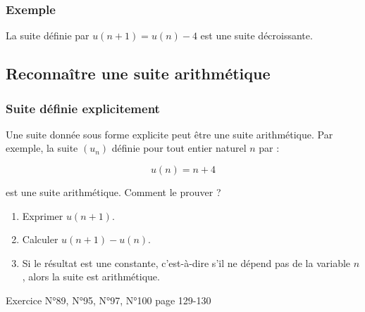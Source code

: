 \documentclass[a4paper,12pt]{article}
\begin{document}
\subsubsection*{Exemple}

La suite définie par $u(n + 1) = u(n) - 4$ est une suite décroissante.

\subsection*{Reconnaître une suite arithmétique}

\subsubsection*{Suite définie explicitement}

Une suite donnée sous forme explicite peut être une suite arithmétique. Par exemple, la suite $(u_n)$ définie pour tout entier naturel $n$ par :

\[
u(n) = n + 4
\]

est une suite arithmétique. Comment le prouver ?

\begin{enumerate}[noitemsep]
    \item Exprimer $u(n + 1)$.
    \item Calculer $u(n + 1) - u(n)$.
    \item Si le résultat est une constante, c'est-à-dire s'il ne dépend pas de la variable $n$, alors la suite est arithmétique.
\end{enumerate}

{\vspace{6em}}

\begin{tcolorbox}[colback=blue!10!white, colframe=blue!75!black, title=Exercices]
  Exercice N°89, N°95, N°97, N°100 page 129-130
\end{tcolorbox}
\end{document}
